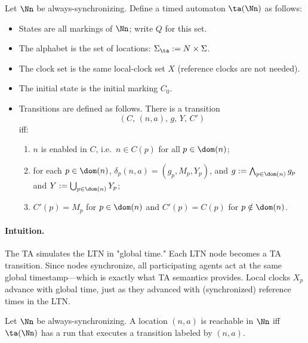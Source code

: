 \begin{definition}
\label{def:ta-always}
Let $\Nn$ be always-synchronizing. Define a timed automaton $\ta(\Nn)$ as follows:
\begin{itemize}
  \item States are all markings of $\Nn$; write $Q$ for this set.
  \item The alphabet is the set of locations: $\Sigma_{\ta} := N\times \Sigma$.
  \item The clock set is the same local-clock set $X$ (reference clocks are not needed).
  \item The initial state is the initial marking $C_0$.
  \item Transitions are defined as follows. There is a transition
  \[
     (C,\, (n,a),\, g,\, Y,\, C')
  \]
  iff:
  \begin{enumerate}
    \item $n$ is enabled in $C$, i.e.\ $n\in C(p)$ for all $p\in\dom(n)$;
    \item for each $p\in \dom(n)$, $\delta_p(n,a)=(g_p,M_p,Y_p)$, and
          $g := \bigwedge_{p\in\dom(n)} g_p$ and $Y := \bigcup_{p\in\dom(n)} Y_p$;
    \item $C'(p)=M_p$ for $p\in\dom(n)$ and $C'(p)=C(p)$ for $p\notin\dom(n)$.
  \end{enumerate}
\end{itemize}
\end{definition}

\paragraph{Intuition.} The TA simulates the LTN in "global time." Each LTN node becomes a TA transition. Since nodes synchronize, all participating agents act at the same global timestamp—which is exactly what TA semantics provides. Local clocks $X_p$ advance with global time, just as they advanced with (synchronized) reference times in the LTN.

\begin{lemma}
\label{lem:ta-for-always-sync}
Let $\Nn$ be always-synchronizing. A location $(n,a)$ is reachable in $\Nn$ iff
$\ta(\Nn)$ has a run that executes a transition labeled by $(n,a)$.
\end{lemma}


